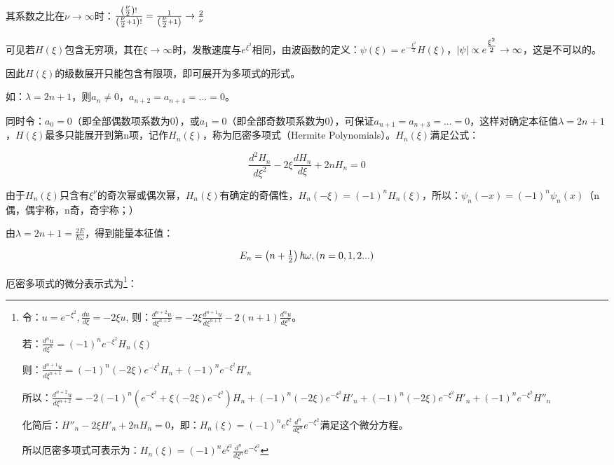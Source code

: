 其系数之比在$\nu  \to \infty $时：$\frac{{\left( {{\textstyle{\nu  \over 2}}} \right)!}}{{\left( {{\textstyle{\nu  \over 2}} + 1} \right)!}} = \frac{1}{{\left( {{\textstyle{\nu  \over 2}} + 1} \right)}} \to \frac{2}{\nu }$

可见若$H(\xi )$包含无穷项，其在$\xi  \to \infty $时，发散速度与$e^{\xi ^2 } $相同，由波函数的定义：$\psi (\xi ) = e^{ - \frac{{\xi ^2 }}{2}} H\left( \xi  \right)$，$\left| \psi  \right| \propto e^{{\textstyle{{\xi ^2 } \over 2}}}  \to \infty $，这是不可以的。

因此$H(\xi )$的级数展开只能包含有限项，即可展开为多项式的形式。

如：$\lambda  = 2n + 1$，则$a_n  \ne 0$，$a_{n + 2}  = a_{n + 4}  = ... = 0$。

同时令：$a_0  = 0$（即全部偶数项系数为0），或$a_1  = 0$（即全部奇数项系数为0），可保证$a_{n + 1}  = a_{n + 3}  = ... = 0$，这样对确定本征值$\lambda  = 2n + 1$，$H(\xi )$最多只能展开到第n项，记作$H_n (\xi )$，称为厄密多项式（Hermite Polynomials）。$H_n (\xi )$满足公式：

\begin{equation}\label{10-8}
\frac{{d^2 H_n }}{{d\xi ^2 }} - 2\xi \frac{{dH_n }}{{d\xi }} + 2nH_n  = 0
\end{equation}

由于$H_n (\xi )$只含有$\xi ^\nu  $的奇次幂或偶次幂，$H_n (\xi )$有确定的奇偶性，$H_n ( - \xi ) = \left( { - 1} \right)^n H_n (\xi )$，所以：$\psi _n ( - x) = \left( { - 1} \right)^n \psi _n (x)$（n偶，偶宇称，n奇，奇宇称；）


由$\lambda  = 2n + 1 = \frac{{2E}}{{\hbar \omega }}$，得到能量本征值：

\begin{equation}\label{10-8}
E_n  = \left( {n + {\textstyle{1 \over 2}}} \right)\hbar \omega, (n = 0,1,2...)
\end{equation}


厄密多项式的微分表示式为\footnote{令：$u = e^{ - \xi ^2 } ,\frac{{du}}{{d\xi }} =  - 2\xi u$, 则：$\frac{{d^{n + 2} u}}{{d\xi ^{n + 2} }} =  - 2\xi \frac{{d^{n + 1} u}}{{d\xi ^{n + 1} }} - 2(n + 1)\frac{{d^n u}}{{d\xi ^n }}$。

若：$\frac{{d^n u}}{{d\xi ^n }} = \left( { - 1} \right)^n e^{ - \xi ^2 } H_n \left( \xi  \right)$

则：$\frac{{d^{n + 1} u}}{{d\xi ^{n + 1} }} = ( - 1)^n ( - 2\xi )e^{ - \xi ^2 } H_n  + ( - 1)^n e^{ - \xi ^2 } H'_n $

所以：$\frac{{d^{n + 2} u}}{{d\xi ^{n + 2} }} =  - 2\left( { - 1} \right)^n \left( {e^{ - \xi ^2 }  + \xi \left( { - 2\xi } \right)e^{ - \xi ^2 } } \right)H_n  + \left( { - 1} \right)^n \left( { - 2\xi } \right)e^{ - \xi ^2 } H'_n  + \left( { - 1} \right)^n \left( { - 2\xi } \right)e^{ - \xi ^2 } H'_n  + \left( { - 1} \right)^n e^{ - \xi ^2 } H''_n $

化简后：$H''_n  - 2\xi H'_n  + 2nH_n  = 0$，即：$H_n \left( \xi  \right) = \left( { - 1} \right)^n e^{\xi ^2 } \frac{{d^n }}{{d\xi ^n }}e^{ - \xi ^2 } $满足这个微分方程。

所以厄密多项式可表示为：$H_n \left( \xi  \right) = \left( { - 1} \right)^n e^{\xi ^2 } \frac{{d^n }}{{d\xi ^n }}e^{ - \xi ^2 } $}：

